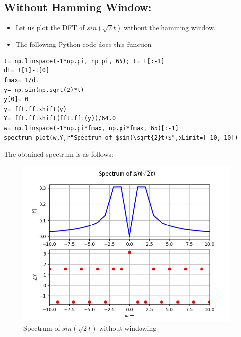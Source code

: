 \documentclass[11pt, a4paper]{article}
\begin{document}
\subsection{Without Hamming Window:}
\begin{itemize}
    \item Let us plot the DFT of $sin(\sqrt{2}t)$ without the hamming window.
    \item The following Python code does this function
\end{itemize}
    \lstset{language=Python}
    \lstset{basicstyle=\footnotesize}
    \begin{lstlisting}
t= np.linspace(-1*np.pi, np.pi, 65); t= t[:-1]     
dt= t[1]-t[0]
fmax= 1/dt
y= np.sin(np.sqrt(2)*t)
y[0]= 0
y= fft.fftshift(y)
Y= fft.fftshift(fft.fft(y))/64.0
w= np.linspace(-1*np.pi*fmax, np.pi*fmax, 65)[:-1]
spectrum_plot(w,Y,r"Spectrum of $sin(\sqrt{2}t)$",xLimit=[-10, 10])
    \end{lstlisting}
    The obtained spectrum is as follows:
            \begin{figure}[H]
            \centering
            \includegraphics[scale=0.6]{Figure_0.png}
            \caption{Spectrum of $sin(\sqrt{2}t)$ without windowing}
            \label{fig:Fig1}
        \end{figure}
\end{document}
